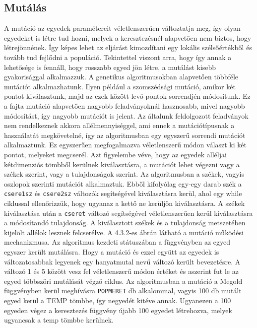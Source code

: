 \documentclass[12ppt,a4paper,oneside]{report}
\begin{document}
        \subsection{Mutálás} %
           	 A mutáció az egyedek paramétereit véletlenszerűen változtatja meg, így olyan egyedeket is létre tud hozni, melyek a keresztezésnél alapvetően nem biztos, hogy létrejönnének. Így képes lehet az eljárást kimozdítani egy lokális szélsőértékből és tovább tud fejlődni a 		populáció. Tekintettel viszont arra, hogy így annak a lehetősége is fennáll, hogy rosszabb egyed jön létre, a mutálást kisebb gyakorisággal alkalmazzuk. 
		A genetikus algoritmusokban alapvetően többféle mutációt alkalmazhatunk. Ilyen például a szomszédsági mutáció, amikor két pontot kiválasztunk, majd az ezek között levő pontok sorrendjén módosítunk. Ez a fajta mutáció alapvetően nagyobb feladványoknál hasznosabb, 		mivel nagyobb módosítást, így nagyobb mutációt is jelent. Az általunk feldolgozott feladványok nem rendelkeznek akkora allélmennyiséggel, ami ennek a mutációtípusnak a használatát megkövetelné, így az algoritmusban egy egyszerű sorrendi mutációt alkalmaztunk. Ez 		egyszerűen megfogalmazva véletlenszerű módon választ ki két pontot, melyeket megcserél.
		Azt figyelembe véve, hogy az egyedek alléljai kétdimenziós tömbből kerülnek kiválasztásra, a mutációt lehet végezni vagy a székek szerint, vagy a tulajdonságok szerint. Az algoritmusban a székek, vagyis oszlopok szerinti mutációt alkalmaztuk.
	Ebből kifolyólag egy-egy darab szék a \texttt{csere1sz} és \texttt{csere2sz} változók segítségével kiválasztásra kerül, ahol egy while ciklussal ellenőrizzük, hogy ugyanaz a kettő ne kerüljön kiválasztásra. A székek kiválasztása után a \texttt{cseret} változó segítségével véletlenszerűen kerül kiválasztásra a módosítandó tulajdonság. A kiválasztott székek és a tulajdonság metszetében kijelölt allélok lesznek felcserélve.
	A 4.3.2-es ábrán látható a mutáció működési mechanizmusa.
		Az algoritmus kezdeti státuszában a függvényben az egyed egyszer került mutálásra. Hogy a mutáció és ezzel együtt az egyedek is változatosabbak legyenek egy hanyatmutal nevű változó került bevezetésre. A változó 1 és 5 között vesz fel véletlenszerű módon értéket 		és aszerint fut le az egyed többszöri mutálását végző ciklus.
	Az algoritmusban a mutáció a Megold függvényben kerül meghívásra \texttt{POPMERET} db alkalommal, vagyis 100 db mutált egyed kerül a TEMP tömbbe, így negyedét kitéve annak. Ugyanezen a 100 egyeden végez a keresztezés függvény újabb 100 egyedet létrehozva, melyek 		ugyancsak a temp tömbbe kerülnek.
\end{document}
